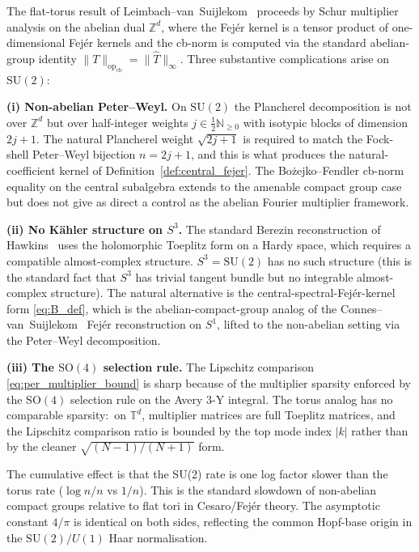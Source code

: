 \documentclass[11pt,a4paper]{article}
\theoremstyle{plain}
\theoremstyle{definition}
\newcommand{\sthree}{S^{3}}
\newcommand{\opnorm}[1]{\lVert #1 \rVert_{\mathrm{op}}}
\newcommand{\norm}[1]{\lVert #1 \rVert}
\newcommand{\T}{\mathbb{T}}
\newcommand{\N}{\mathbb{N}}
\newcommand{\Z}{\mathbb{Z}}
\newcommand{\SU}{\mathrm{SU}}
\newcommand{\SO}{\mathrm{SO}}
\begin{document}
The flat-torus result of Leimbach--van~Suijlekom~\cite{leimbach_vs2024}
proceeds by Schur multiplier analysis on the abelian dual $\Z^d$,
where the Fej\'er kernel is a tensor product of one-dimensional
Fej\'er kernels and the cb-norm is computed via the standard
abelian-group identity $\opnorm{T}_{\mathrm{cb}} = \norm{\widehat{T}}_\infty$.
Three substantive complications arise on $\SU(2)$:

\textbf{(i) Non-abelian Peter--Weyl.} On $\SU(2)$ the Plancherel
decomposition is not over $\Z^d$ but over half-integer weights
$j \in \tfrac{1}{2}\N_{\ge 0}$ with isotypic blocks of dimension
$2j+1$. The natural Plancherel weight $\sqrt{2j+1}$ is required to
match the Fock-shell Peter--Weyl bijection $n = 2j+1$, and this is
what produces the natural-coefficient kernel of
Definition~\ref{def:central_fejer}. The Bo{\.z}ejko--Fendler
\cite{bozejko_fendler1991} cb-norm equality on the central subalgebra
extends to the amenable compact group case but does not give as direct
a control as the abelian Fourier multiplier framework.

\textbf{(ii) No K\"ahler structure on $\sthree$.} The standard Berezin
reconstruction of Hawkins~\cite{hawkins2000} uses the holomorphic
Toeplitz form on a Hardy space, which requires a compatible
almost-complex structure. $\sthree = \SU(2)$ has no such structure
(this is the standard fact that $\sthree$ has trivial tangent bundle
but no integrable almost-complex structure). The natural alternative
is the central-spectral-Fej\'er-kernel form
\eqref{eq:B_def}, which is the abelian-compact-group analog
of the Connes--van~Suijlekom~\cite{connes_vs2021} Fej\'er
reconstruction on $S^1$, lifted to the non-abelian setting via the
Peter--Weyl decomposition.

\textbf{(iii) The $\SO(4)$ selection rule.} The Lipschitz comparison
\eqref{eq:per_multiplier_bound} is sharp because of the multiplier
sparsity enforced by the $\SO(4)$ selection rule on the Avery 3-Y
integral. The torus analog has no comparable sparsity:\ on $\T^d$,
multiplier matrices are full Toeplitz matrices, and the Lipschitz
comparison ratio is bounded by the
top mode index $|k|$ rather than by the cleaner
$\sqrt{(N-1)/(N+1)}$ form.

The cumulative effect is that the SU(2) rate is one log factor slower
than the torus rate ($\log n / n$ vs $1 / n$). This is the standard
slowdown of non-abelian compact groups relative to flat tori in
Cesaro/Fej\'er theory. The asymptotic constant $4/\pi$ is identical
on both sides, reflecting the common Hopf-base origin in the
$\SU(2)/U(1)$ Haar normalisation.
\end{document}
